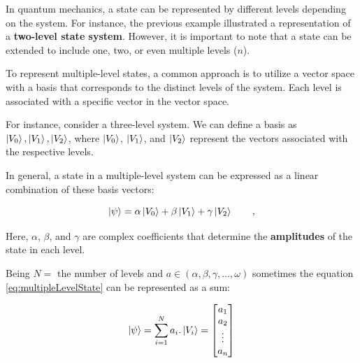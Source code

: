 			\par In quantum mechanics, a state can be represented by different levels depending on the system. For instance, the previous example illustrated a representation of a \textbf{two-level state system}. However, it is important to note that a state can be extended to include one, two, or even multiple levels ($n$).\newline
			
			\par To represent multiple-level states, a common approach is to utilize a vector space with a basis that corresponds to the distinct levels of the system. Each level is associated with a specific vector in the vector space.\newline
			
			\par For instance, consider a three-level system. We can define a basis as ${\ket{V_0}, \ket{V_1}, \ket{V_2}}$, where $\ket{V_0}$, $\ket{V_1}$, and $\ket{V_2}$ represent the vectors associated with the respective levels.
			
			\par In general, a state in a multiple-level system can be expressed as a linear combination of these basis vectors:
			
			\begin{equation}
				\ket{\psi} = \alpha \ket{V_0} + \beta \ket{V_1} + \gamma \ket{V_2} \qquad,
				\label{eq:multipleLevelState}
			\end{equation}
		
			\par Here, $\alpha$, $\beta$, and $\gamma$ are complex coefficients that determine the \textbf{amplitudes} of the state in each level.\newline
			
			\par Being $N=$ the number of levels and $a \in (\alpha, \beta, \gamma, \dots , \omega)$ sometimes the equation \ref{eq:multipleLevelState} can be represented as a sum:
			
			\begin{equation}
				\ket{\psi} = \sum_{i=1}^{N} a_i . \ket{V_i}= 
				\begin{bmatrix}
					a_{1} \\
					a_{2} \\
					\vdots \\
					a_{n}
				\end{bmatrix}
				\label{eq:multipleLevelStateSum}
			\end{equation}
		
